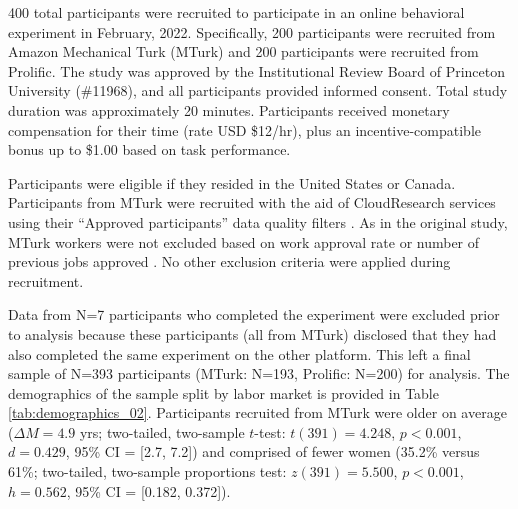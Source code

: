 \documentclass[a4paper,notitlepage,12pt]{article}
\begin{document}
400 total participants were recruited to participate in an online behavioral experiment in February, 2022. Specifically, 200 participants were recruited from Amazon Mechanical Turk (MTurk) and 200 participants were recruited from Prolific. The study was approved by the Institutional Review Board of Princeton University (\#11968), and all participants provided informed consent. Total study duration was approximately 20 minutes. Participants received monetary compensation for their time (rate USD \$12/hr), plus an incentive-compatible bonus up to \$1.00 based on task performance. 

Participants were eligible if they resided in the United States or Canada. Participants from MTurk were recruited with the aid of CloudResearch services \cite{litman2017turkprime-2} using their ``Approved participants''  data quality filters \cite{cloudresearch_2020-2}. As in the original study, MTurk workers were not excluded based on work approval rate or number of previous jobs approved \cite{robinson2019tapped-2}. No other exclusion criteria were applied during recruitment.

Data from N=7 participants who completed the experiment were excluded prior to analysis because these participants (all from MTurk) disclosed that they had also completed the same experiment on the other platform. This left a final sample of N=393 participants (MTurk: N=193, Prolific: N=200) for analysis. The demographics of the sample split by labor market is provided in Table \ref{tab:demographics_02}. Participants recruited from MTurk were older on average ($\Delta M = 4.9$ yrs; two-tailed, two-sample $t$-test: $t(391)=4.248$, $p<0.001$, $d = 0.429$, 95\% CI = [2.7, 7.2]) and comprised of fewer women (35.2\% versus 61\%; two-tailed, two-sample proportions test: $z(391)=5.500$, $p<0.001$, $h=0.562$, 95\% CI = [0.182, 0.372]). 
\end{document}
